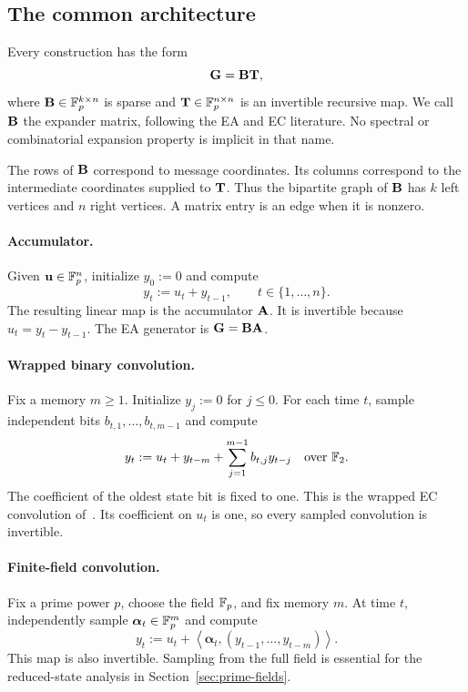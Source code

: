\subsection{The common architecture}

Every construction has the form
\begin{equation}
 \mathbf G=\mathbf B\mathbf T,
 \label{eq:common-architecture}
\end{equation}
where $\mathbf B\in\mathbb F_p^{k\times n}$ is sparse and
$\mathbf T\in\mathbb F_p^{n\times n}$ is an invertible recursive map.  We call $\mathbf B$ the
expander matrix, following the EA and EC literature.  No spectral or
combinatorial expansion property is implicit in that name.

The rows of $\mathbf B$ correspond to message coordinates.  Its columns correspond
to the intermediate coordinates supplied to $\mathbf T$.  Thus the bipartite graph
of $\mathbf B$ has $k$ left vertices and $n$ right vertices.  A matrix entry is an
edge when it is nonzero.

\paragraph{Accumulator.}
Given $\mathbf u\in\mathbb F_p^n$, initialize $y_0:=0$ and compute
\begin{equation}
 y_t:=u_t+y_{t-1},\qquad t\in\{1,\ldots,n\}.
 \label{eq:accumulator-definition}
\end{equation}
The resulting linear map is the accumulator $\mathbf A$.  It is invertible because
$u_t=y_t-y_{t-1}$.  The EA generator is $\mathbf G=\mathbf B\mathbf A$.

\paragraph{Wrapped binary convolution.}
Fix a memory $m\geq1$.  Initialize $y_j:=0$ for $j\leq0$.  For each time
$t$, sample independent bits $b_{t,1},\ldots,b_{t,m-1}$ and compute
\begin{equation}
 y_t:=u_t+y_{t-m}+\sum_{j=1}^{m-1}b_{t,j}y_{t-j}
 \quad\text{over }\mathbb F_2.
 \label{eq:wrapped-convolution}
\end{equation}
The coefficient of the oldest state bit is fixed to one.  This is the wrapped
EC convolution of~\cite{EC}.  Its coefficient on $u_t$ is one, so every
sampled convolution is invertible.

\paragraph{Finite-field convolution.}
Fix a prime power $p$, choose the field $\mathbb F_p$, and fix memory $m$.  At time
$t$, independently sample
$\boldsymbol\alpha_t\in\mathbb F_p^m$ and compute
\begin{equation}
 y_t:=u_t+
 \left\langle\boldsymbol\alpha_t,
 (y_{t-1},\ldots,y_{t-m})\right\rangle.
 \label{eq:prime-convolution}
\end{equation}
This map is also invertible.  Sampling from the full field is essential for
the reduced-state analysis in Section~\ref{sec:prime-fields}.

